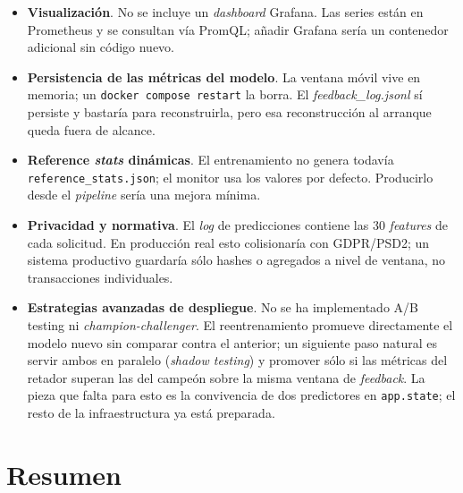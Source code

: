 \documentclass[12pt,a4paper]{report}
\begin{document}
\begin{itemize}
    \item \textbf{Visualización}. No se incluye un \textit{dashboard} Grafana. Las series están en Prometheus y se consultan vía PromQL; añadir Grafana sería un contenedor adicional sin código nuevo.
    \item \textbf{Persistencia de las métricas del modelo}. La ventana móvil vive en memoria; un \texttt{docker compose restart} la borra. El \textit{feedback\_log.jsonl} sí persiste y bastaría para reconstruirla, pero esa reconstrucción al arranque queda fuera de alcance.
    \item \textbf{Reference \textit{stats} dinámicas}. El entrenamiento no genera todavía \texttt{reference\_stats.json}; el monitor usa los valores por defecto. Producirlo desde el \textit{pipeline} sería una mejora mínima.
    \item \textbf{Privacidad y normativa}. El \textit{log} de predicciones contiene las 30 \textit{features} de cada solicitud. En producción real esto colisionaría con GDPR/PSD2; un sistema productivo guardaría sólo hashes o agregados a nivel de ventana, no transacciones individuales.
    \item \textbf{Estrategias avanzadas de despliegue}. No se ha implementado A/B testing ni \textit{champion-challenger}. El reentrenamiento promueve directamente el modelo nuevo sin comparar contra el anterior; un siguiente paso natural es servir ambos en paralelo (\textit{shadow testing}) y promover sólo si las métricas del retador superan las del campeón sobre la misma ventana de \textit{feedback}. La pieza que falta para esto es la convivencia de dos predictores en \texttt{app.state}; el resto de la infraestructura ya está preparada.
\end{itemize}

\section{Resumen}
\label{sec:hito5-resumen}
\end{document}
